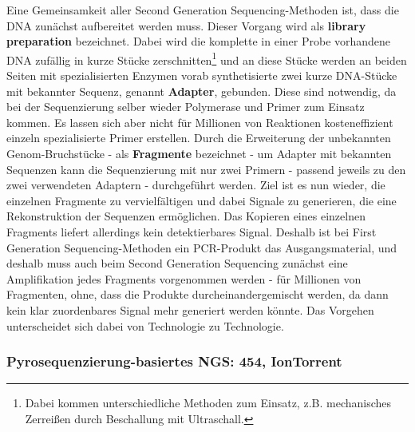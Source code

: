 Eine Gemeinsamkeit aller Second Generation Sequencing-Methoden ist, dass die DNA zunächst aufbereitet werden muss. Dieser Vorgang wird als \textbf{library preparation} bezeichnet. Dabei wird die komplette in einer Probe vorhandene DNA zufällig in kurze Stücke zerschnitten\footnote{Dabei kommen unterschiedliche Methoden zum Einsatz, z.B. mechanisches Zerreißen durch Beschallung mit Ultraschall.} und an diese Stücke werden an beiden Seiten mit spezialisierten Enzymen vorab synthetisierte zwei kurze DNA-Stücke mit bekannter Sequenz, genannt \textbf{Adapter}, gebunden. Diese sind notwendig, da bei der Sequenzierung selber wieder Polymerase und Primer zum Einsatz kommen. Es lassen sich aber nicht für Millionen von Reaktionen kosteneffizient einzeln spezialisierte Primer erstellen. Durch die Erweiterung der unbekannten Genom-Bruchstücke - als \textbf{Fragmente} bezeichnet - um Adapter mit bekannten Sequenzen kann die Sequenzierung mit nur zwei Primern - passend jeweils zu den zwei verwendeten Adaptern - durchgeführt werden. Ziel ist es nun wieder, die einzelnen Fragmente zu vervielfältigen und dabei Signale zu generieren, die eine Rekonstruktion der Sequenzen ermöglichen. Das Kopieren eines einzelnen Fragments liefert allerdings kein detektierbares Signal. Deshalb ist bei First Generation Sequencing-Methoden ein PCR-Produkt das Ausgangsmaterial, und deshalb muss auch beim Second Generation Sequencing zunächst eine Amplifikation jedes Fragments vorgenommen werden - für Millionen von Fragmenten, ohne, dass die Produkte durcheinandergemischt werden, da dann kein klar zuordenbares Signal mehr generiert werden könnte. Das Vorgehen unterscheidet sich dabei von Technologie zu Technologie. 

\subsubsection{Pyrosequenzierung-basiertes NGS: 454, IonTorrent}

